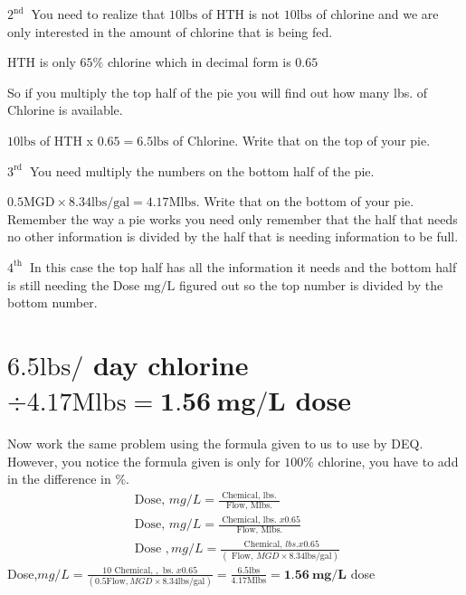 \documentclass[10pt]{article}
\begin{document}
$2^{\text {nd }}$ You need to realize that $10 \mathrm{lbs}$ of $\mathrm{HTH}$ is not $10 \mathrm{lbs}$ of chlorine and we are only interested in the amount of chlorine that is being fed.

$\mathrm{HTH}$ is only $65 \%$ chlorine which in decimal form is $0.65$

So if you multiply the top half of the pie you will find out how many lbs. of Chlorine is available.

$10 \mathrm{lbs}$ of HTH x $0.65=6.5 \mathrm{lbs}$ of Chlorine. Write that on the top of your pie.

$3^{\text {rd }}$ You need multiply the numbers on the bottom half of the pie.

$0.5 \mathrm{MGD} \times 8.34 \mathrm{lbs} / \mathrm{gal}=4.17 \mathrm{Mlbs}$. Write that on the bottom of your pie. Remember the way a pie works you need only remember that the half that needs no other information is divided by the half that is needing information to be full.

$4^{\text {th }}$ In this case the top half has all the information it needs and the bottom half is still needing the Dose $\mathrm{mg} / \mathrm{L}$ figured out so the top number is divided by the bottom number.

\section{$6.5 \mathrm{lbs} /$ day chlorine $\div 4.17 \mathrm{Mlbs}=\mathbf{1 . 5 6} \mathbf{~ m g} / \mathbf{L}$ dose}
Now work the same problem using the formula given to us to use by DEQ. However, you notice the formula given is only for $100 \%$ chlorine, you have to add in the difference in $\%$.
$$
\begin{gathered}
\text { Dose, } m g / L=\frac{\text { Chemical, lbs. }}{\text { Flow, Mlbs. }} \\
\text { Dose, } m g / L=\frac{\text { Chemical, lbs. } x 0.65}{\text { Flow, Mlbs. }} \\
\text { Dose }, m g / L=\frac{\text { Chemical, } l b s . x 0.65}{(\text { Flow, } M G D \times 8.34 \mathrm{lbs} / \mathrm{gal})}
\end{gathered}
$$
Dose,$m g / L=\frac{10 \text { Chemical, }, \text { bs. } x 0.65}{(0.5 \mathrm{Flow}, M G D \times 8.34 \mathrm{lbs} / \mathrm{gal})}=\frac{6.5 \mathrm{lbs}}{4.17 \mathrm{Mlbs}}=\mathbf{1 . 5 6} \mathbf{~ m g} / \mathbf{L}$ dose
\end{document}
